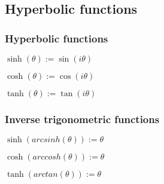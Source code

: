 
\subsection{Hyperbolic functions}

\subsubsection{Hyperbolic functions}

$\sinh(\theta ):=\sin(i\theta )$

$\cosh(\theta ):=\cos(i\theta )$

$\tanh(\theta ):=\tan(i\theta )$

\subsubsection{Inverse trigonometric functions}

$\sinh (arcsinh (\theta )):=\theta $

$\cosh (arccosh (\theta )):=\theta $

$\tanh (arctan (\theta )):=\theta $

